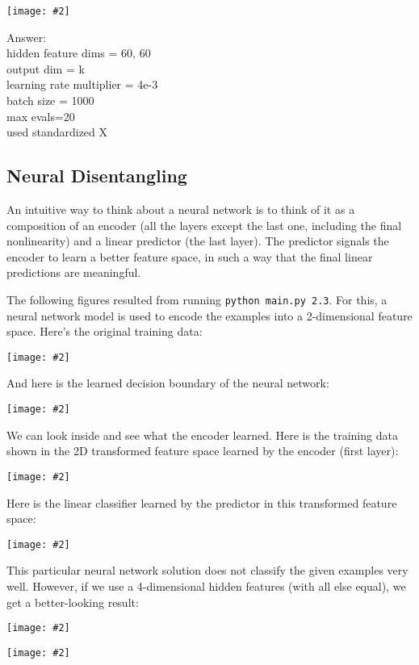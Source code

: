\documentclass{article}
\newcommand{\gre}[1]{\textcolor{gre}{#1}}
\newcommand\ans[1]{\par\gre{Answer: #1}}
\newcommand{\centerfig}[2]{\begin{center}\texttt{[image: \#2]}\end{center}}
\begin{document}
\centerfig{0.8}{figs/q2.2-code}
\ans{\\
hidden feature dims = 60, 60\\
output dim = k\\
learning rate multiplier = 4e-3\\
batch size = 1000\\
max evals=20\\
used standardized X\\
}



\subsection{Neural Disentangling}

An intuitive way to think about a neural network is to think of it as a composition of an encoder (all the layers except the last one, including the final nonlinearity) and a linear predictor (the last layer). The predictor signals the encoder to learn a better feature space, in such a way that the final linear predictions are meaningful.

The following figures resulted from running \texttt{python main.py 2.3}. For this, a neural network model is used to encode the examples into a 2-dimensional feature space. Here's the original training data:

\centerfig{.7}{./figs/sinusoids.png}

And here is the learned decision boundary of the neural network:

\centerfig{.7}{./figs/sinusoids_decision_boundary_[2]_2.png}

We can look inside and see what the encoder learned. Here is the training data shown in the 2D transformed feature space learned by the encoder (first layer):

\centerfig{.7}{./figs/sinusoids_learned_features_[2]_2.png}

Here is the linear classifier learned by the predictor in this transformed feature space:

\centerfig{.7}{./figs/sinusoids_linear_boundary_[2]_2.png}


This particular neural network solution does not classify the given examples very well. However, if we use a 4-dimensional hidden features (with all else equal), we get a better-looking result:

\centerfig{.7}{./figs/sinusoids_decision_boundary_[4]_2.png}
\centerfig{.7}{./figs/sinusoids_linear_boundary_[4]_2.png}
\end{document}
